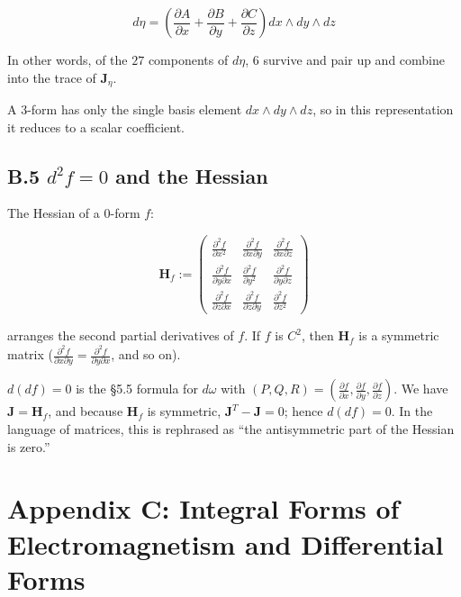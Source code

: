 \[d\eta = \left( \frac{\partial A}{\partial x} + \frac{\partial B}{\partial y} + \frac{\partial C}{\partial z} \right) dx \wedge dy \wedge dz\]

In other words, of the \(27\) components of \(d\eta\), \(6\) survive and
pair up and combine into the trace of \(\mathbf{J}_\eta\).

A \(3\)-form has only the single basis element
\(dx \wedge dy \wedge dz\), so in this representation it reduces to a
scalar coefficient.

\hypertarget{b.5-d2-f-0-and-the-hessian}{%
\subsection{\texorpdfstring{B.5 \(d^2 f = 0\) and the
Hessian}{B.5 d\^{}2 f = 0 and the Hessian}}\label{b.5-d2-f-0-and-the-hessian}}

The Hessian of a \(0\)-form \(f\):

\[\mathbf{H}_f := \begin{pmatrix}
\frac{\partial^2 f}{\partial x^2} & \frac{\partial^2 f}{\partial x \partial y} & \frac{\partial^2 f}{\partial x \partial z} \\
\frac{\partial^2 f}{\partial y \partial x} & \frac{\partial^2 f}{\partial y^2} & \frac{\partial^2 f}{\partial y \partial z} \\
\frac{\partial^2 f}{\partial z \partial x} & \frac{\partial^2 f}{\partial z \partial y} & \frac{\partial^2 f}{\partial z^2}
\end{pmatrix}\]

arranges the second partial derivatives of \(f\). If \(f\) is \(C^2\),
then \(\mathbf{H}_f\) is a symmetric matrix
(\(\frac{\partial^2 f}{\partial x \partial y} = \frac{\partial^2 f}{\partial y \partial x}\),
and so on).

\(d(df) = 0\) is the §5.5 formula for \(d\omega\) with
\((P,Q,R) = (\frac{\partial f}{\partial x}, \frac{\partial f}{\partial y}, \frac{\partial f}{\partial z})\).
We have \(\mathbf{J} = \mathbf{H}_f\), and because \(\mathbf{H}_f\) is
symmetric, \(\mathbf{J}^T - \mathbf{J} = 0\); hence \(d(df) = 0\). In
the language of matrices, this is rephrased as ``the antisymmetric part
of the Hessian is zero.''

\hypertarget{appendix-c-integral-forms-of-electromagnetism-and-differential-forms}{%
\section{Appendix C: Integral Forms of Electromagnetism and Differential
Forms}\label{appendix-c-integral-forms-of-electromagnetism-and-differential-forms}}

